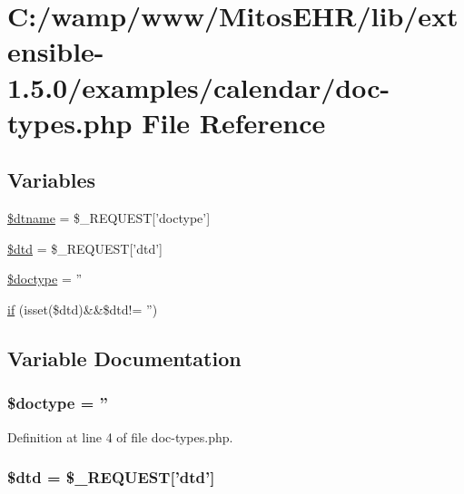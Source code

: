 \hypertarget{doc-types_8php}{\section{\-C\-:/wamp/www/\-Mitos\-E\-H\-R/lib/extensible-\/1.5.0/examples/calendar/doc-\/types.php \-File \-Reference}
\label{doc-types_8php}
}
\subsection*{\-Variables}
\begin{DoxyCompactItemize}
\item 
\hyperlink{doc-types_8php_acac5ac47805ec48a296b31e0463716df}{\$dtname} = \$\-\_\-\-R\-E\-Q\-U\-E\-S\-T\mbox{[}'doctype'\mbox{]}
\item 
\hyperlink{doc-types_8php_a1dd49b352b76a9d705467153c3e4636e}{\$dtd} = \$\-\_\-\-R\-E\-Q\-U\-E\-S\-T\mbox{[}'dtd'\mbox{]}
\item 
\hyperlink{doc-types_8php_a2db22b139a95a45702135d4d82210c2d}{\$doctype} = ''
\item 
\hyperlink{doc-types_8php_a527aa2b84ffedbe59a0cf6ea4f373cc7}{if} (isset(\$dtd)\&\&\$dtd!= '')
\end{DoxyCompactItemize}


\subsection{\-Variable \-Documentation}
\hypertarget{doc-types_8php_a2db22b139a95a45702135d4d82210c2d}{
\subsubsection[{\$doctype}]{\setlength{\rightskip}{0pt plus 5cm}\$doctype = ''}}\label{doc-types_8php_a2db22b139a95a45702135d4d82210c2d}


\-Definition at line 4 of file doc-\/types.\-php.

\hypertarget{doc-types_8php_a1dd49b352b76a9d705467153c3e4636e}{
\subsubsection[{\$dtd}]{\setlength{\rightskip}{0pt plus 5cm}\$dtd = \$\-\_\-\-R\-E\-Q\-U\-E\-S\-T\mbox{[}'dtd'\mbox{]}}}\label{doc-types_8php_a1dd49b352b76a9d705467153c3e4636e}


